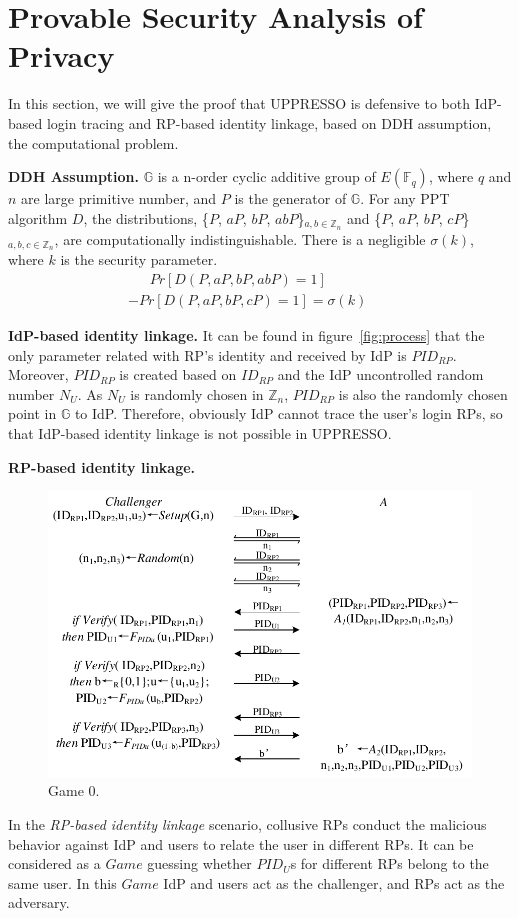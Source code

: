 \section{Provable Security Analysis of Privacy}
\label{sec:privacy}


In this section, we will give the proof that UPPRESSO is defensive to both IdP-based login tracing and RP-based identity linkage, based on DDH assumption\cite{GoldwasserK16}, the computational problem. 


\noindent\textbf{DDH Assumption.}
$\mathbb{G}$ is a n-order  cyclic additive group of $E(\mathbb{F}_q)$, where $q$ and $n$ are large primitive number, and $P$ is the generator of $\mathbb{G}$.  For any PPT algorithm $D$, the distributions, \{$P$, $aP$, $bP$, $abP$\}$_{a,b \in \mathbb{Z}_n}$ and \{$P$, $aP$, $bP$, $cP$\}$_{a,b,c \in \mathbb{Z}_n}$, are computationally indistinguishable. There is a negligible $\sigma(k)$, where $k$ is the security parameter. 
\begin{multline*}
    \ \ \ \ \ \ \ Pr[D(P, aP, bP, abP)=1]\\-Pr[D(P, aP, bP, cP)=1]=\sigma(k)\ \ \ \ \ \ \ \ 
\end{multline*}

\noindent\textbf{IdP-based identity linkage.} 
It can be found in figure~\ref{fig:process} that the only parameter related with RP's identity and received by IdP is $PID_{RP}$. Moreover, $PID_{RP}$ is created based on $ID_{RP}$ and the IdP uncontrolled random number $N_U$. As $N_U$ is randomly chosen in $\mathbb{Z}_n$,  $PID_{RP}$ is also the randomly chosen point in $\mathbb{G}$ to IdP. Therefore, obviously IdP cannot trace the user's login RPs, so that IdP-based identity linkage is not possible in UPPRESSO.

\noindent\textbf{RP-based identity linkage.} 

\begin{figure}[t]
  \centering
  \includegraphics[width=1\linewidth]{fig/game0.pdf}
  \caption{Game 0.}
  \label{fig:game0}
\end{figure}
In the \emph{RP-based identity linkage} scenario, collusive RPs conduct the malicious behavior against IdP and users to relate the user in different RPs. It can be considered as a $Game$ guessing whether $PID_U$s for different RPs belong to the same user.  In this $Game$ IdP and users act as the challenger, and RPs act as the adversary. 

